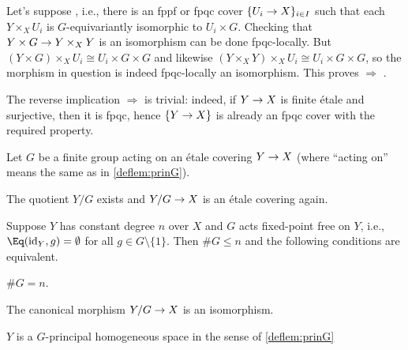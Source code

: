 \begin{proof*}
	Let's suppose , i.e., there is an fppf or fpqc cover $\{U_i\morphism X\}_{i\in I}$ such that each $Y\times_XU_i$ is $G$-equivariantly isomorphic to $U_i\times G$. Checking that $Y\times G\morphism Y\times_XY$ is an isomorphism can be done fpqc-locally. But $(Y\times G)\times_XU_i\cong U_i\times G\times G$ and likewise $(Y\times_XY)\times_XU_i\cong U_i\times G\times G$, so the morphism in question is indeed fpqc-locally an isomorphism. This proves  $\Rightarrow$ .
	
	The reverse implication  $\Rightarrow$  is trivial: indeed, if $Y\morphism X$ is finite étale and surjective, then it is fpqc, hence $\{Y\morphism X\}$ is already an fpqc cover with the required property.
\end{proof*}
\begin{prop}\label{prop:Galois}
	Let $G$ be a finite group acting on an étale covering $Y\morphism X$ (where \enquote{acting on} means the same as in \cref{deflem:prinG}).
	\begin{alphanumerate}
		\item The quotient $Y/G$ exists and $Y/G\morphism X$ is an étale covering again.
		\item Suppose $Y$ has constant degree $n$ over $X$ and $G$ acts fixed-point free on $Y$, i.e., $\Eq(\id_Y,g)=\emptyset$ for all $g\in G\setminus\{1\}$. Then $\# G\leq n$ and the following conditions are equivalent.
		\begin{numerate}
			\item $\# G=n$.
			\item The canonical morphism $Y/G\morphism X$ is an isomorphism.
			\item $Y$ is a $G$-principal homogeneous space in the sense of \cref{deflem:prinG}
		\end{numerate}
	\end{alphanumerate}
\end{prop}
